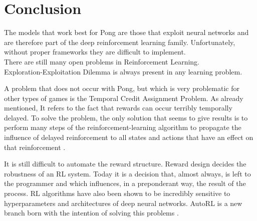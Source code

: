 \section{Conclusion}
\label{sec:conclusion}
The models that work best for Pong are those that exploit neural networks and are therefore part of the deep reinforcement learning family.
Unfortunately, without proper frameworks they are difficult to implement. \\

There are still many open problems in Reinforcement Learning. \\

Exploration-Exploitation Dilemma is always present in any learning problem.

A problem that does not occur with Pong, but which is very problematic for other types of games is the Temporal Credit Assignment Problem. As already mentioned, It refers to the fact that rewards can occur terribly temporally delayed. To solve the problem, the only solution that seems to give results is to perform many steps of the reinforcement-learning algorithm to propagate the influence of delayed reinforcement to all states and actions that have an effect on that reinforcement \cite{sutton1984temporal}. 

It is still difficult to automate the reward structure. Reward design decides the robustness of an RL system.
Today it is a decision that, almost always, is left to the programmer and which influences, 
in a preponderant way, the result of the process. 
RL algorithms have also been shown to be incredibly sensitive to hyperparameters and
architectures of deep neural networks. AutoRL is a new branch born with the intention of solving this problems \cite{parker2022automated}.
